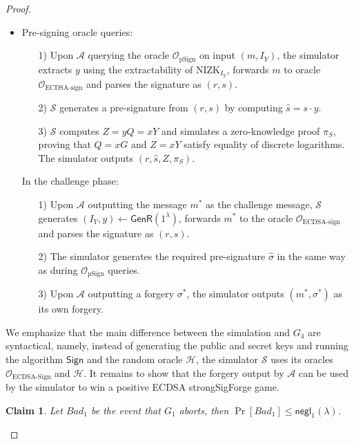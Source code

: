 \documentclass{llncs}
\newtheorem{Claim}{Claim}
\begin{document}
\begin{proof}
\begin{itemize}
\item Pre-signing oracle queries: 

\begin{itemize}
\item[1)] Upon $\mathcal{A}$ querying the oracle $\mathcal{O}_{\text{pSign}}$ on input $(m, I_Y)$, the simulator extracts $y$ using the extractability of NIZK$_{I_Y}$, forwards $m$ to oracle $\mathcal{O}_{\text{ECDSA-sign}}$ and parses the signature as $(r, s)$.

\item[2)] $\mathcal{S}$ generates a pre-signature from $(r, s)$ by computing $\hat{s} = s\cdot y$.

\item[3)] $\mathcal{S}$ computes $Z=yQ=xY$ and simulates a zero-knowledge proof $\pi_S$, proving that $Q=xG$ and $Z=xY$ satisfy equality of discrete logarithms. The simulator outputs $(r, \hat{s}, Z, \pi_S)$.
\end{itemize}

In the challenge phase: 
\begin{itemize}
\item[1)] Upon $\mathcal{A}$ outputting the message $m^*$ as the challenge message, $\mathcal{S}$ generates $(I_Y,y)\leftarrow \mathsf{GenR}(1^\lambda)$, forwards $m^*$ to the oracle $\mathcal{O}_{\text{ECDSA-sign}}$ and parses the signature as $(r, s)$.

\item[2)] The simulator generates the required pre-signature $\hat{\sigma}$ in the same way as during $\mathcal{O}_{\text{pSign}}$ queries.

\item[3)] Upon $\mathcal{A}$ outputting a forgery $\sigma^*$, the simulator outputs $(m^*, \sigma^*)$ as its own forgery.
\end{itemize}
\end{itemize}

We emphasize that the main difference between the simulation and $G_4$ are syntactical, namely, instead of generating the public and secret keys and running the algorithm $\mathsf{Sign}$ and the random oracle $\mathcal{H}$, the simulator $\mathcal{S}$ uses its oracles $\mathcal{O}_{\text{ECDSA-Sign}}$ and $\mathcal{H}$. It remains to show that the forgery output by $\mathcal{A}$ can be used by the simulator to win a positive ECDSA strongSigForge game.

\begin{Claim}
Let $Bad_1$ be the event that $G_1$ aborts, then $\Pr[Bad_1] \leq \mathsf{negl}_1(\lambda)$.
\end{Claim}


\end{proof}
\end{document}
